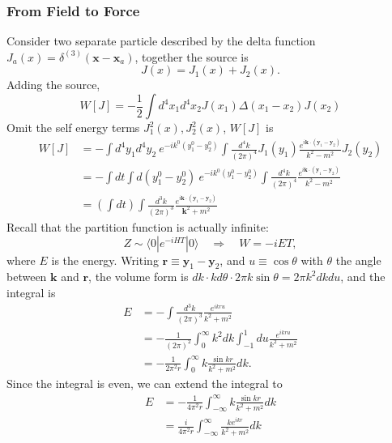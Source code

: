 \subsubsection{From Field to Force}
Consider two separate particle described by the delta function $J_a(x) = \delta^{(3)}(\bm x - \bm x_a)$, together the source is
\begin{equation}
	J(x) = J_1(x) + J_2(x).
\end{equation}
Adding the source,
\begin{equation*}
	W[J] = -\frac{1}{2}\int d^4x_1 d^4 x_2 J(x_1) \Delta(x_1-x_2) J(x_2)
\end{equation*}
Omit the self energy terms $J_1^2(x), J_2^2(x)$, $W[J]$ is
\begin{equation}
\begin{aligned}
	W[J] &= -\int d^4 y_1 d^4 y_2\ e^{-ik^0(y_1^0-y_2^0)}\int \frac{d^4 k}{(2\pi)^4} J_1(y_1)\frac{e^{i\bm k\cdot (\bm y_1-\bm y_2)}}{k^2-m^2} J_2(y_2) \\
	&= -\int  dt \int d (y_1^0 - y_2^0) \ e^{-ik^0(y_1^0-y_2^0)}\int \frac{d^4 k}{(2\pi)^4} \frac{e^{i\bm k\cdot (\bm y_1-\bm y_2)}}{k^2-m^2} \\
	&= \left(\int dt \right)\int \frac{d^3 k}{(2\pi)^3} \frac{e^{i\bm k\cdot (\bm y_1-\bm y_2)}}{\bm k^2 + m^2}
\end{aligned}
\end{equation}
Recall that the partition function is actually infinite:
\begin{equation}
	Z \sim \langle 0| e^{-iHT} |0\rangle \quad \Longrightarrow \quad
	W = -iET,
\end{equation}
where $E$ is the energy.
Writing $\bm r \equiv \bm y_1 - \bm y_2$, and $u \equiv \cos\theta$ with $\theta$ the angle between $\bm k$ and $\bm r$, the volume form is $dk \cdot kd\theta \cdot  2\pi k \sin \theta = 2\pi k^2 dk du$, and the integral is
\begin{equation}
\begin{aligned}
	E &= -\int \frac{d^3 k}{(2\pi)^3} \frac{e^{i k r u}}{k^2 + m^2} \\
	&= - \frac{1}{(2\pi)^2} \int_0^\infty k^2 dk \int_{-1}^1 du \frac{e^{ikru}}{k^2 +m^2} \\
	&= -\frac{1}{2\pi^2 r} \int_0^\infty k  \frac{\sin kr}{k^2 +m^2} dk.
\end{aligned}
\end{equation}
Since the integral is even, we can extend the integral to
\begin{equation}
\begin{aligned}
	E &= -\frac{1}{4\pi^2 r} \int_{-\infty}^\infty k  \frac{\sin kr}{k^2 +m^2} dk \\
	&= \frac{i}{4\pi^2 r} \int_{-\infty}^\infty \frac{k e^{ikr}}{k^2 +m^2} dk
\end{aligned}
\end{equation}
